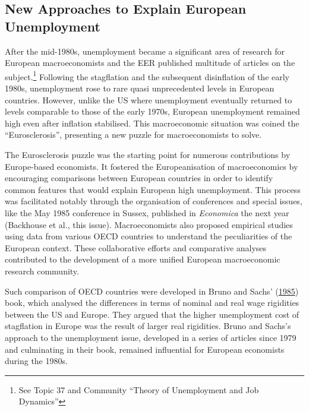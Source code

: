 \documentclass[
  12pt,
  onecolumn]{article}
\begin{document}
\hypertarget{unemployment}{%
\subsection{New Approaches to Explain European Unemployment}\label{unemployment}}

After the mid-1980s, unemployment became a significant area of research for European macroeconomists and the EER published multitude of articles on the subject.\footnote{See Topic 37 and Community ``Theory of Unemployment and Job Dynamics''} Following the stagflation and the subsequent disinflation of the early 1980s, unemployment rose to rare quasi unprecedented levels in European countries. However, unlike the US where unemployment eventually returned to levels comparable to those of the early 1970s, European unemployment remained high even after inflation stabilised. This macroeconomic situation was coined the ``Eurosclerosis'', presenting a new puzzle for macroeconomists to solve.

The Eurosclerosis puzzle was the starting point for numerous contributions by Europe-based economists. It fostered the Europeanisation of macroeconomics by encouraging comparisons between European countries in order to identify common features that would explain European high unemployment. This process was facilitated notably through the organisation of conferences and special issues, like the May 1985 conference in Sussex, published in \emph{Economica} the next year (Backhouse et al., this issue). Macroeconomists also proposed empirical studies using data from various OECD countries to understand the peculiarities of the European context. These collaborative efforts and comparative analyses contributed to the development of a more unified European macroeconomic research community.

Such comparison of OECD countries were developed in Bruno and Sachs' (\protect\hyperlink{ref-brunosachs1985}{1985}) book, which analysed the differences in terms of nominal and real wage rigidities between the US and Europe. They argued that the higher unemployment cost of stagflation in Europe was the result of larger real rigidities. Bruno and Sachs's approach to the unemployment issue, developed in a series of articles since 1979 and culminating in their book, remained influential for European economists during the 1980s.
\end{document}
